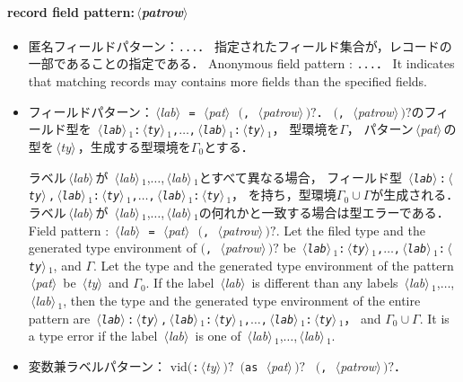 \documentclass{jbook}
\newcommand{\txt}[2]{#2}
\newcommand{\code}[1]{\mbox{\large\tt #1}}
\newcommand{\nonterm}[1]{\mbox{$\,\langle$}{\it #1}\mbox{$\rangle\,$}}
\newcommand{\term}[1]{\mbox{{\tt #1}}}
\newcommand{\optional}[1]{\mbox{$($}{\protect #1}\mbox{$)?$}}
\newcommand{\ass}{\Gamma}
\begin{document}
\paragraph{\txt{レコードフィールドパターン}{record field pattern}:\nonterm{patrow}}

\begin{itemize}
\item 
\ifjp%
匿名フィールドパターン：\term{...}．
	指定されたフィールド集合が，レコードの一部であることの指定である．
\else%
	Anonymous field pattern : \term{...}．
	It indicates that matching records may contains more fields than
the specified fields.
\fi%
\item 
\ifjp%
	フィールドパターン：\nonterm{lab}\ \term{=}\ \nonterm{pat}\ \optional{\term{,}\ \nonterm{patrow}}．
	\optional{\term{,}\ \nonterm{patrow}}のフィールド型を
\code{\nonterm{lab}$_1$:\nonterm{ty}$_1$,$\ldots$,\nonterm{lab}$_1$:\nonterm{ty}$_1$}，
型環境を$\ass$，
パターン\nonterm{pat}の型を\nonterm{ty}，生成する型環境を$\ass_0$とする．

	ラベル\nonterm{lab}が
\nonterm{lab}$_1$,$\ldots$,\nonterm{lab}$_1$とすべて異なる場合，
フィールド型
\code{\nonterm{lab}:\nonterm{ty},\nonterm{lab}$_1$:\nonterm{ty}$_1$,$\ldots$,\nonterm{lab}$_1$:\nonterm{ty}$_1$}，
を持ち，型環境$\ass_0 \cup \ass$が生成される．
	ラベル\nonterm{lab}が
\nonterm{lab}$_1$,$\ldots$,\nonterm{lab}$_1$の何れかと一致する場合は型エラーである．
\else%
Field pattern : \nonterm{lab}\ \term{=}\ \nonterm{pat}\ \optional{\term{,}\ \nonterm{patrow}}.
	Let the filed type and the generated type environment of \optional{\term{,}\ \nonterm{patrow}} be
\code{\nonterm{lab}$_1$:\nonterm{ty}$_1$,$\ldots$,\nonterm{lab}$_1$:\nonterm{ty}$_1$},
and $\ass$.
	Let the type and the generated type environment of the pattern \nonterm{pat} be \nonterm{ty}
and  $\ass_0$.
	If the label \nonterm{lab} is different than any labels
\nonterm{lab}$_1$,$\ldots$,\nonterm{lab}$_1$, 
then the type and the generated type environment of the entire pattern
are  
\code{\nonterm{lab}:\nonterm{ty},\nonterm{lab}$_1$:\nonterm{ty}$_1$,$\ldots$,\nonterm{lab}$_1$:\nonterm{ty}$_1$}，
and $\ass_0 \cup \ass$.
	It is a type error if the label \nonterm{lab} is one of 
\nonterm{lab}$_1$,$\ldots$,\nonterm{lab}$_1$.
\fi%
\item 
\ifjp%
変数兼ラベルパターン：
vid\optional{\term{:}\nonterm{ty}}\ \optional{\term{as}\ \nonterm{pat}}
\ \optional{\term{,}\ \nonterm{patrow}}．


\end{itemize}
\end{document}
